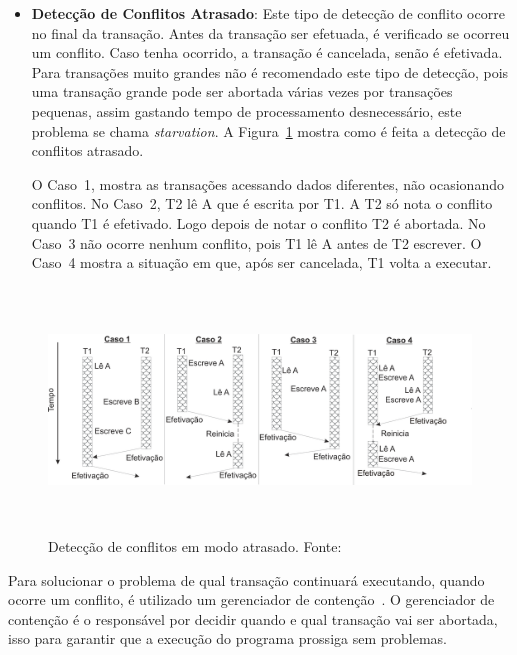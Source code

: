 \documentclass[diss,capa]{texufpel}
\begin{document}
\begin{itemize}
 \item \textbf{Detecção de Conflitos Atrasado}: Este tipo de detecção de conflito ocorre no final da transação.  Antes da transação ser efetuada, é verificado se ocorreu um conflito. Caso tenha ocorrido, a transação é cancelada, senão é efetivada. Para transações muito grandes não é recomendado este tipo de detecção, pois uma transação grande pode ser abortada várias vezes por transações pequenas, assim gastando tempo de processamento desnecessário, este problema se chama \emph{starvation}. A Figura~\ref{figuradeteccaoatrasado} mostra como é feita a detecção de conflitos atrasado.

 O Caso~1, mostra as transações acessando dados diferentes, não ocasionando conflitos. No Caso~2, T2 lê A que é escrita por T1. A T2 só nota o conflito quando T1 é efetivado. Logo depois de notar o conflito T2 é abortada. No Caso~3 não ocorre nenhum conflito, pois T1 lê A antes de T2 escrever. O Caso~4 mostra a situação em que, após ser cancelada, T1 volta a executar.
\end{itemize}


\begin{figure}[!htp]
\centering
\includegraphics[height=6.5cm]{images/conflitoatrasado.png}
\caption{Detecção de conflitos em modo atrasado. Fonte:~\cite{rigotm}}
\label{figuradeteccaoatrasado}
\end{figure}


Para solucionar o problema de qual transação continuará executando, quando ocorre um conflito, é utilizado um gerenciador de contenção~\cite{TM2010}. O gerenciador de contenção é o responsável por decidir quando e qual transação vai ser abortada, isso para garantir que a execução do programa prossiga sem problemas.

\end{document}
